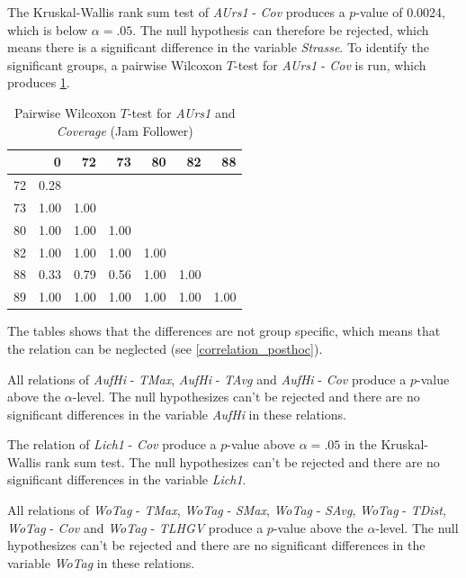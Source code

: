 The Kruskal-Wallis rank sum test of \textit{AUrs1} - \textit{Cov} produces a $p$-value of 0.0024, which is below $\alpha=.05$. The null hypothesis can therefore be rejected, which means there is a significant difference in the variable \textit{Strasse}. To identify the significant groups, a pairwise Wilcoxon $T$-test for \textit{AUrs1} - \textit{Cov} is run, which produces \cref{tbl:wilcoxon_baysis_follower_AUrs1_Cov}. 
\begin{table}[ht]
	\tiny
	\centering
	\begin{tabular}{rrrrrrr}
		\toprule
		& 0 & 72 & 73 & 80 & 82 & 88 \\ 
		\midrule
		72 & 0.28 &  &  &  &  &  \\ 
		73 & 1.00 & 1.00 &  &  &  &  \\ 
		80 & 1.00 & 1.00 & 1.00 &  &  &  \\ 
		82 & 1.00 & 1.00 & 1.00 & 1.00 &  &  \\ 
		88 & 0.33 & 0.79 & 0.56 & 1.00 & 1.00 &  \\ 
		89 & 1.00 & 1.00 & 1.00 & 1.00 & 1.00 & 1.00 \\ 
		\bottomrule
	  \end{tabular}
    \caption{Pairwise Wilcoxon $T$-test for \textit{AUrs1} and \textit{Coverage} (Jam Follower)}
    \label{tbl:wilcoxon_baysis_follower_AUrs1_Cov}
\end{table}
The tables shows that the differences are not group specific, which means that the relation can be neglected (see \cref{correlation_posthoc}).

All relations of \textit{AufHi} - \textit{TMax}, \textit{AufHi} - \textit{TAvg} and \textit{AufHi} - \textit{Cov} produce a $p$-value above the $\alpha$-level. The null hypothesizes can't be rejected and there are no significant differences in the variable \textit{AufHi} in these relations.

The relation of \textit{Lich1} - \textit{Cov} produce a $p$-value above $\alpha=.05$ in the Kruskal-Wallis rank sum test. The null hypothesizes can't be rejected and there are no significant differences in the variable \textit{Lich1}.

All relations of \textit{WoTag} - \textit{TMax}, \textit{WoTag} - \textit{SMax}, \textit{WoTag} - \textit{SAvg}, \textit{WoTag} - \textit{TDist}, \textit{WoTag} - \textit{Cov} and \textit{WoTag} - \textit{TLHGV} produce a $p$-value above the $\alpha$-level. The null hypothesizes can't be rejected and there are no significant differences in the variable \textit{WoTag} in these relations.

